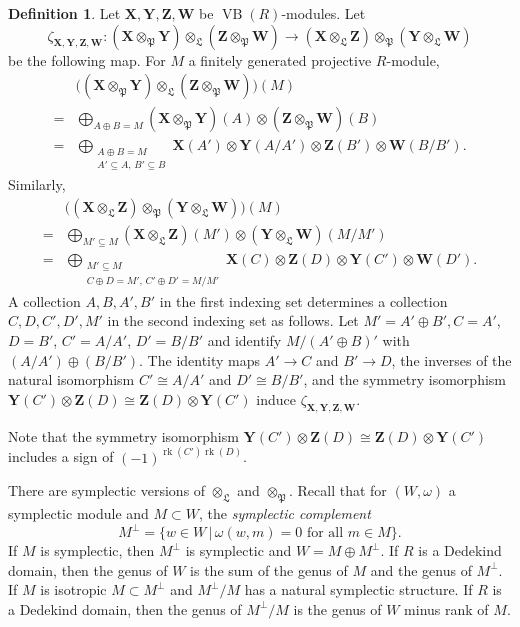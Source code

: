 \documentclass[11pt,letterpaper]{amsart}
\DeclareMathOperator{\VB}{VB}
\newcommand{\gW}{\mathbf{W}}
\newcommand{\gX}{\mathbf{X}}
\newcommand{\gY}{\mathbf{Y}}
\newcommand{\gZ}{\mathbf{Z}}
\newcommand{\C}{\mathbb{C}}
\newcommand{\PP}{\mathfrak{P}}
\newcommand{\LL}{\mathfrak{L}}
\numberwithin{theoremcounter}{section}
\theoremstyle{definition}
\newtheorem{definition}[Defauto]{Definition}
\theoremstyle{remark}
\DeclareMathOperator{\rk}{rk}
\begin{document}
\begin{definition}
    Let $\gX,\gY,\gZ,\gW$ be $\VB(R)$-modules. Let 
    $$\zeta_{\gX,\gY,\gZ,\gW} \colon (\gX \otimes_\PP \gY) \otimes_\LL (\gZ \otimes_\PP \gW) \to (\gX \otimes_\LL \gZ) \otimes_\PP (\gY \otimes_\LL \gW)$$ 
    be the following map. For $M$ a finitely generated projective $R$-module, 
    \begin{align*}
        &\Big((\gX \otimes_\PP \gY) \otimes_\LL (\gZ \otimes_\PP \gW)\Big)(M)\\
        =&\bigoplus_{A \oplus B =M} (\gX \otimes_\PP \gY)(A) \otimes (\gZ \otimes_\PP \gW)(B)\\
        =&\bigoplus_{\substack{A \oplus B =M\\  A' \subseteq A,\, B' \subseteq B}} \gX(A') \otimes \gY(A/A') \otimes \gZ(B') \otimes \gW(B/B'). 
    \end{align*}
    Similarly, 
    \begin{align*}
    &\big((\gX \otimes_\LL \gZ) \otimes_\PP (\gY \otimes_\LL \gW) \Big)(M)\\
    =&\bigoplus_{M' \subseteq M} (\gX \otimes_\LL \gZ)(M') \otimes (\gY \otimes_\LL \gW)(M/M')\\
    =&\bigoplus_{\substack{ M' \subseteq M\\C \oplus D=M', \, C' \oplus D'=M/M'} } \gX(C) \otimes \gZ(D) \otimes \gY(C') \otimes \gW(D').
    \end{align*}
    A collection $A,B,A',B'$  in the first indexing set determines a collection $C,D,C',D',M'$ in the second indexing set as follows.
    Let  $M'=A' \oplus B', C=A'$,  
    $D=B'$, $ 
    C'=A/A' $, $D'=B/B'$ and identify $M/(A' \oplus B)'
    $ with $(A/A') \oplus (B/B')$. The identity maps $A' \to C$ and $B' \to D$, the inverses of the natural isomorphism $ 
    C' \cong A/A'$ and $D' \cong B/B'$, and the symmetry isomorphism  $\gY(C') \otimes \gZ(D) \cong \gZ(D) \otimes \gY(C')$    
    induce $\zeta_{\gX,\gY,\gZ,\gW}$. 
\end{definition}

Note that the symmetry isomorphism $\gY(C') \otimes \gZ(D) \cong \gZ(D) \otimes \gY(C')$ includes a sign of  $(-1)^{\rk(C')\rk(D)}$.


There are symplectic versions of $\otimes_\LL$ and $\otimes_\PP$. Recall that for $(W,\omega)$ a symplectic module and $M \subset W$, the \emph{symplectic complement} 
$$M^\perp=\{w \in W \,|\, \omega(w,m) =0\text{ for all } m \in M \}.$$ %
If $M$ is symplectic, then $M^\perp$ is symplectic and $W =M \oplus M^\perp$. If $R$ is a Dedekind domain, then the genus of $W$ is the sum of the genus of $M$ and the genus of  $M^\perp$. If $M$ is isotropic $M \subset M^\perp$ and $M^\perp/M$ has a natural symplectic structure. If $R$ is a Dedekind domain, then the genus of $M^\perp /M$ is the genus of $W$ minus rank of $M$.
\end{document}
